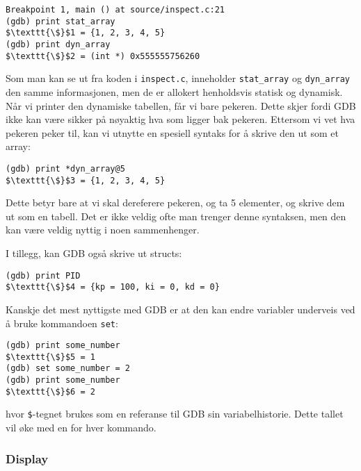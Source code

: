 \begin{lstlisting}[mathescape=true,keywordstyle=\color{black}]
Breakpoint 1, main () at source/inspect.c:21
(gdb) print stat_array
$\texttt{\$}$1 = {1, 2, 3, 4, 5}
(gdb) print dyn_array
$\texttt{\$}$2 = (int *) 0x555555756260

\end{lstlisting}




Som man kan se ut fra koden i \verb|inspect.c|, inneholder \verb|stat_array| og \verb|dyn_array| den samme informasjonen, men de er allokert henholdsvis statisk og dynamisk. Når vi printer den dynamiske tabellen, får vi bare pekeren. Dette skjer fordi GDB ikke kan være sikker på nøyaktig hva som ligger bak pekeren. Ettersom vi vet hva pekeren peker til, kan vi utnytte en spesiell syntaks for å skrive den ut som et array:

\begin{lstlisting}[mathescape=true,keywordstyle=\color{black}]
(gdb) print *dyn_array@5
$\texttt{\$}$3 = {1, 2, 3, 4, 5}

\end{lstlisting}


Dette betyr bare at vi skal dereferere pekeren, og ta 5 elementer, og skrive dem ut som en tabell. Det er ikke veldig ofte man trenger denne syntaksen, men den kan være veldig nyttig i noen sammenhenger.

I tillegg, kan GDB også skrive ut structs:

\begin{lstlisting}[mathescape=true,keywordstyle=\color{black}]
(gdb) print PID
$\texttt{\$}$4 = {kp = 100, ki = 0, kd = 0}
\end{lstlisting}

Kanskje det mest nyttigste med GDB er at den kan endre variabler underveis ved å bruke kommandoen \verb|set|:

\begin{lstlisting}[mathescape=true,keywordstyle=\color{black}]
(gdb) print some_number
$\texttt{\$}$5 = 1
(gdb) set some_number = 2
(gdb) print some_number
$\texttt{\$}$6 = 2
\end{lstlisting}


hvor \verb|$|-tegnet brukes som en referanse til GDB sin variabelhistorie. Dette tallet vil øke med en for hver kommando.

\subsubsection*{Display}

